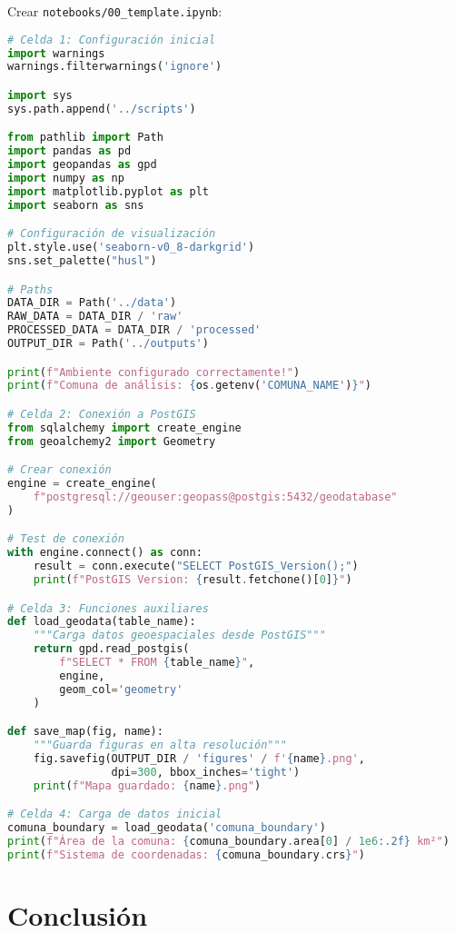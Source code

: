 \documentclass[12pt,a4paper]{article}
\begin{document}
Crear \texttt{notebooks/00\_template.ipynb}:

\begin{lstlisting}[language=Python]
# Celda 1: Configuración inicial
import warnings
warnings.filterwarnings('ignore')

import sys
sys.path.append('../scripts')

from pathlib import Path
import pandas as pd
import geopandas as gpd
import numpy as np
import matplotlib.pyplot as plt
import seaborn as sns

# Configuración de visualización
plt.style.use('seaborn-v0_8-darkgrid')
sns.set_palette("husl")

# Paths
DATA_DIR = Path('../data')
RAW_DATA = DATA_DIR / 'raw'
PROCESSED_DATA = DATA_DIR / 'processed'
OUTPUT_DIR = Path('../outputs')

print(f"Ambiente configurado correctamente!")
print(f"Comuna de análisis: {os.getenv('COMUNA_NAME')}")

# Celda 2: Conexión a PostGIS
from sqlalchemy import create_engine
from geoalchemy2 import Geometry

# Crear conexión
engine = create_engine(
    f"postgresql://geouser:geopass@postgis:5432/geodatabase"
)

# Test de conexión
with engine.connect() as conn:
    result = conn.execute("SELECT PostGIS_Version();")
    print(f"PostGIS Version: {result.fetchone()[0]}")

# Celda 3: Funciones auxiliares
def load_geodata(table_name):
    """Carga datos geoespaciales desde PostGIS"""
    return gpd.read_postgis(
        f"SELECT * FROM {table_name}",
        engine,
        geom_col='geometry'
    )

def save_map(fig, name):
    """Guarda figuras en alta resolución"""
    fig.savefig(OUTPUT_DIR / 'figures' / f'{name}.png',
                dpi=300, bbox_inches='tight')
    print(f"Mapa guardado: {name}.png")

# Celda 4: Carga de datos inicial
comuna_boundary = load_geodata('comuna_boundary')
print(f"Área de la comuna: {comuna_boundary.area[0] / 1e6:.2f} km²")
print(f"Sistema de coordenadas: {comuna_boundary.crs}")
\end{lstlisting}

\section{Conclusión}
\end{document}
